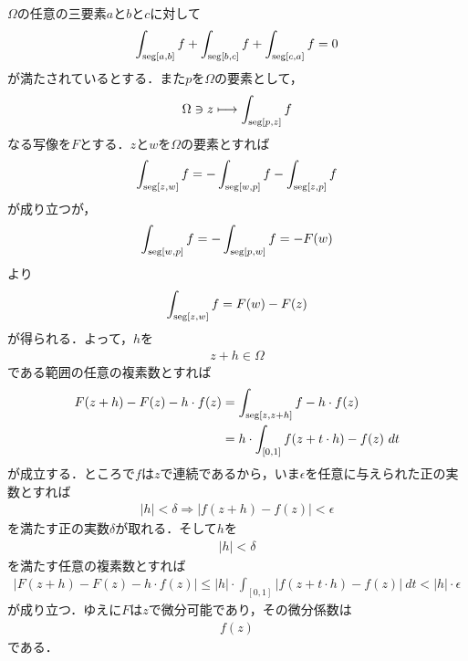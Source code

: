 	\begin{sketch}
		$\Omega$の任意の三要素$a$と$b$と$c$に対して
		\begin{align}
			\int_{\operatorname{seg}[a,b]} f + \int_{\operatorname{seg}[b,c]} f + \int_{\operatorname{seg}[c,a]} f = 0
		\end{align}
		が満たされているとする．また$p$を$\Omega$の要素として，
		\begin{align}
			\Omega \ni z \longmapsto \int_{\operatorname{seg}[p,z]} f
		\end{align}
		なる写像を$F$とする．$z$と$w$を$\Omega$の要素とすれば
		\begin{align}
			\int_{\operatorname{seg}[z,w]} f = -\int_{\operatorname{seg}[w,p]} f - \int_{\operatorname{seg}[z,p]} f
		\end{align}
		が成り立つが，
		\begin{align}
			\int_{\operatorname{seg}[w,p]} f = -\int_{\operatorname{seg}[p,w]} f = -F(w)
		\end{align}
		より
		\begin{align}
			\int_{\operatorname{seg}[z,w]} f = F(w) - F(z)
		\end{align}
		が得られる．よって，$h$を
		\begin{align}
			z + h \in \Omega
		\end{align}
		である範囲の任意の複素数とすれば
		\begin{align}
			F(z+h) - F(z) - h \cdot f(z)
			&= \int_{\operatorname{seg}[z,z+h]} f - h \cdot f(z) \\
			&= h \cdot \int_{[0,1]} f(z + t \cdot h) - f(z)\ dt
		\end{align}
		が成立する．ところで$f$は$z$で連続であるから，いま$\epsilon$を任意に与えられた正の実数とすれば
		\begin{align}
			|h| < \delta \Longrightarrow |f(z+h) - f(z)| < \epsilon
		\end{align}
		を満たす正の実数$\delta$が取れる．そして$h$を
		\begin{align}
			|h| < \delta
		\end{align}
		を満たす任意の複素数とすれば
		\begin{align}
			|F(z+h) - F(z) - h \cdot f(z)|
			\leq |h| \cdot \int_{[0,1]} |f(z + t \cdot h) - f(z)|\ dt
			< |h| \cdot \epsilon
		\end{align}
		が成り立つ．ゆえに$F$は$z$で微分可能であり，その微分係数は
		\begin{align}
			f(z)
		\end{align}
		である．
		\QED
	\end{sketch}
	
